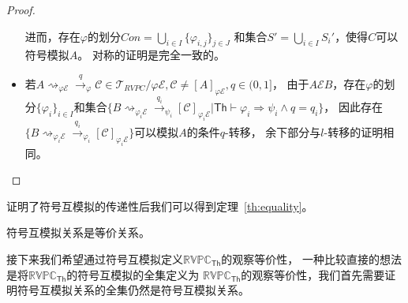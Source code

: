 \begin{proof}
\begin{itemize}
{         进而，存在$\varphi$的划分$Con=\bigcup_{i\in I}\{\varphi_{i,j}\}_{j\in J}$
         和集合$S'=\bigcup_{i\in I}S_i'$，使得$C$可以符号模拟$A$。
         对称的证明是完全一致的。
      }
      \item {
         若$A\rightsquigarrow_{\varphi \mathcal{E}}\stackrel{q}{\rightarrow}_{\varphi} \mathcal{C}\in \mathcal{T}_{RVPC}/\varphi\mathcal{E},\mathcal{C}\neq [A]_{\varphi\mathcal{E}},q\in(0,1]$，
         由于$A\mathcal{E}B$，存在$\varphi$的划分$\{\varphi_i\}_{i\in I}$和集合$\{B\rightsquigarrow_{\varphi_i\mathcal{E}}\stackrel{q_i}{\rightarrow}_{\psi_i} [\mathcal{C}]_{\varphi_i\mathcal{E}}|\mathsf{Th}\vdash \varphi_i\Rightarrow \psi_i\wedge q=q_i\}$，
         因此存在$\{B\rightsquigarrow_{\varphi_i\mathcal{E}}\stackrel{q_i}{\rightarrow}_{\varphi_i} [\mathcal{C}]_{\varphi_i\mathcal{E}}\}$可以模拟$A$的条件$q$-转移，
         余下部分与$l$-转移的证明相同。
      }
   \end{itemize}
\end{proof}
证明了符号互模拟的传递性后我们可以得到定理~\ref{th:equality}。
\begin{theorem}\label{th:equality}
   符号互模拟关系是等价关系。
\end{theorem}

接下来我们希望通过符号互模拟定义$\mathbb{RVPC}_{\mathsf{Th}}$的观察等价性，
一种比较直接的想法是将$\mathbb{RVPC}_{\mathsf{Th}}$的符号互模拟的全集定义为
$\mathbb{RVPC}_{\mathsf{Th}}$的观察等价性，我们首先需要证明符号互模拟关系的全集仍然是符号互模拟关系。

